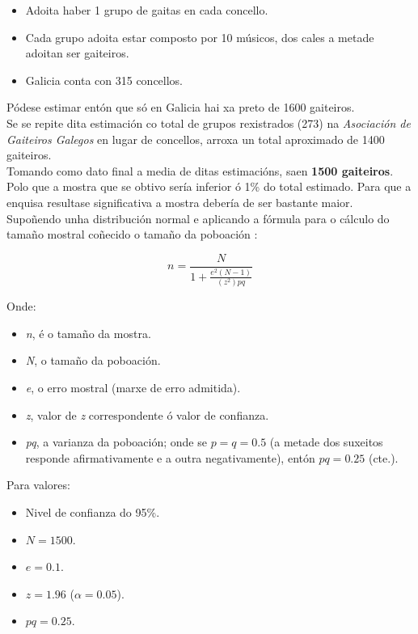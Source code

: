 \begin{itemize}
 \item Adoita haber 1 grupo de gaitas en cada concello.
 \item Cada grupo adoita estar composto por 10 músicos, dos cales a metade
       adoitan ser gaiteiros.
 \item Galicia conta con 315 concellos.
\end{itemize}

Pódese estimar entón que só en Galicia hai xa preto de 1600 gaiteiros. \\

Se se repite dita estimación co total de grupos rexistrados (273) na
\textit{Asociación de Gaiteiros Galegos} \cite{AGG} en lugar de concellos,
arroxa un total aproximado de 1400 gaiteiros. \\

Tomando como dato final a media de ditas estimacións, saen
\textbf{1500 gaiteiros}. \\

Polo que a mostra que se obtivo sería inferior ó 1\% do total estimado. Para que
a enquisa resultase significativa a mostra debería de ser bastante maior.\\

Supoñendo unha distribución normal e aplicando a fórmula para o cálculo do
tamaño mostral coñecido o tamaño da poboación \cite{TamanoMuestra}:

\begin{equation}
 n = \frac{N}{1 + \frac{e^2(N-1)}{(z^2)pq}}
\end{equation}

Onde:

\begin{itemize}
 \item \textit{n}, é o tamaño da mostra.
 \item \textit{N}, o tamaño da poboación.
 \item \textit{e}, o erro mostral (marxe de erro admitida).
 \item \textit{z}, valor de \textit{z} correspondente ó valor de confianza.
 \item \textit{pq}, a varianza da poboación; onde se $p = q = 0.5$ (a metade
       dos suxeitos responde afirmativamente e a outra negativamente), entón
       $pq = 0.25$ (cte.).
\end{itemize}

Para valores:

\begin{itemize}
 \item Nivel de confianza do 95\%.
 \item $N = 1500$.
 \item $e = 0.1$.
 \item $z = 1.96$ ($\alpha = 0.05$).
 \item $pq = 0.25$.
\end{itemize}

